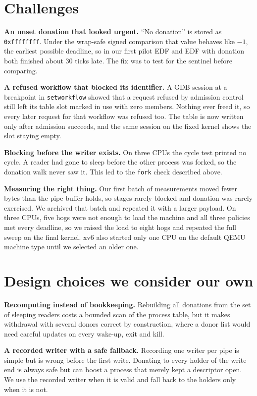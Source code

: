 \documentclass[10pt,a4paper]{article}
\newcommand{\code}[1]{\texttt{#1}}
\begin{document}
\section{Challenges}

\textbf{An unset donation that looked urgent.} ``No donation'' is stored as \code{0xffffffff}. Under the wrap-safe signed comparison that value behaves like $-1$, the earliest possible deadline, so in our first pilot EDF and EDF with donation both finished about 30 ticks late. The fix was to test for the sentinel before comparing.

\textbf{A refused workflow that blocked its identifier.} A GDB session at a breakpoint in \code{setworkflow} showed that a request refused by admission control still left its table slot marked in use with zero members. Nothing ever freed it, so every later request for that workflow was refused too. The table is now written only after admission succeeds, and the same session on the fixed kernel shows the slot staying empty.

\textbf{Blocking before the writer exists.} On three CPUs the cycle test printed no cycle. A reader had gone to sleep before the other process was forked, so the donation walk never saw it. This led to the \code{fork} check described above.

\textbf{Measuring the right thing.} Our first batch of measurements moved fewer bytes than the pipe buffer holds, so stages rarely blocked and donation was rarely exercised. We archived that batch and repeated it with a larger payload. On three CPUs, five hogs were not enough to load the machine and all three policies met every deadline, so we raised the load to eight hogs and repeated the full sweep on the final kernel. xv6 also started only one CPU on the default QEMU machine type until we selected an older one.

\section{Design choices we consider our own}

\textbf{Recomputing instead of bookkeeping.} Rebuilding all donations from the set of sleeping readers costs a bounded scan of the process table, but it makes withdrawal with several donors correct by construction, where a donor list would need careful updates on every wake-up, exit and kill.

\textbf{A recorded writer with a safe fallback.} Recording one writer per pipe is simple but is wrong before the first write. Donating to every holder of the write end is always safe but can boost a process that merely kept a descriptor open. We use the recorded writer when it is valid and fall back to the holders only when it is not.
\end{document}
